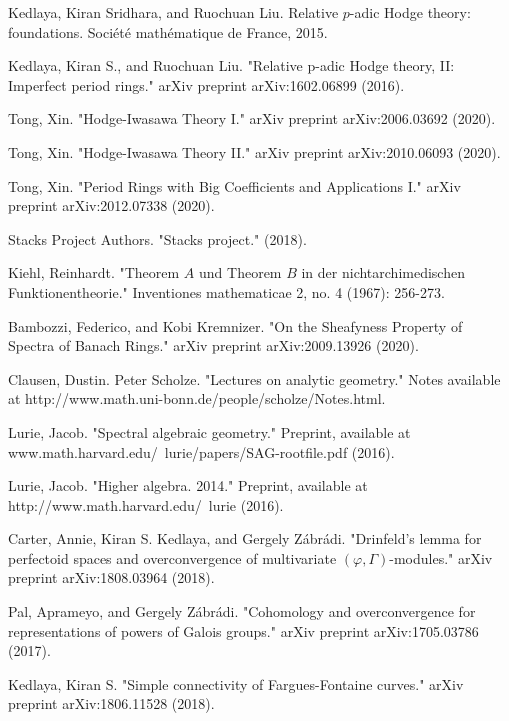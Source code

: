 \documentclass[12pt]{amsart}
\theoremstyle{definition}
\numberwithin{equation}{section}
\begin{document}

\begin{thebibliography}{10}
 Kedlaya, Kiran Sridhara, and Ruochuan Liu. Relative $p$-adic Hodge theory: foundations. Soci\'et\'e math\'ematique de France, 2015.

 Kedlaya, Kiran S., and Ruochuan Liu. "Relative p-adic Hodge theory, II: Imperfect period rings." arXiv preprint arXiv:1602.06899 (2016).

 Tong, Xin. "Hodge-Iwasawa Theory I." arXiv preprint arXiv:2006.03692 (2020).

 Tong, Xin. "Hodge-Iwasawa Theory II." arXiv preprint arXiv:2010.06093 (2020).

 Tong, Xin. "Period Rings with Big Coefficients and Applications I." arXiv preprint arXiv:2012.07338 (2020).

 Stacks Project Authors. "Stacks project." (2018).

 Kiehl, Reinhardt. "Theorem $A$ und Theorem $B$ in der nichtarchimedischen Funktionentheorie." Inventiones mathematicae 2, no. 4 (1967): 256-273.

 Bambozzi, Federico, and Kobi Kremnizer. "On the Sheafyness Property of Spectra of Banach Rings." arXiv preprint arXiv:2009.13926 (2020).

 Clausen, Dustin. Peter Scholze. "Lectures on analytic geometry." Notes available at http://www.math.uni-bonn.de/people/scholze/Notes.html. 

 Lurie, Jacob. "Spectral algebraic geometry." Preprint, available at www.math.harvard.edu/~lurie/papers/SAG-rootfile.pdf (2016).

 Lurie, Jacob. "Higher algebra. 2014." Preprint, available at http://www.math.harvard.edu/~lurie (2016).

 Carter, Annie, Kiran S. Kedlaya, and Gergely Z\'abr\'adi. "Drinfeld's lemma for perfectoid spaces and overconvergence of multivariate $(\varphi,\Gamma)$-modules." arXiv preprint arXiv:1808.03964 (2018).

 Pal, Aprameyo, and Gergely Z\'abr\'adi. "Cohomology and overconvergence for representations of powers of Galois groups." arXiv preprint arXiv:1705.03786 (2017).

 Kedlaya, Kiran S. "Simple connectivity of Fargues-Fontaine curves." arXiv preprint arXiv:1806.11528 (2018).



\end{thebibliography}
\end{document}
